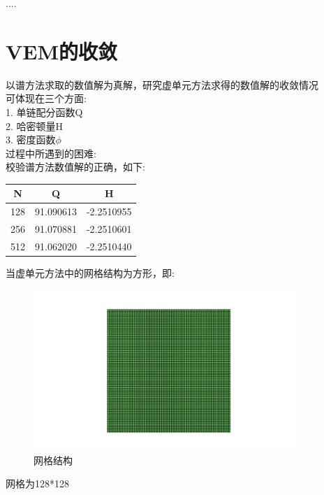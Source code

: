 \documentclass[12pt]{article}
\begin{document}
\begin{CJK}{UTF8}{gkai}
  ....\\
    \section{VEM的收敛}
    以谱方法求取的数值解为真解，研究虚单元方法求得的数值解的收敛情况\\
    
    可体现在三个方面:\\
    
    1. 单链配分函数Q\\
    
    2. 哈密顿量H\\
    
    3. 密度函数$\phi$ \\
    
    过程中所遇到的困难:\\
    
    校验谱方法数值解的正确，如下:\\
    
     \begin{table}[H]
     	\centering
     	\begin{tabular}{ccc}
     		
     		\toprule
     		N&Q & H \\
     		\midrule    
     		128&91.090613&-2.2510955\\
     		256&91.070881&-2.2510601\\
     		512&91.062020&-2.2510440\\
     		\bottomrule
     	\end{tabular}
     \end{table} 
    
     
    
    当虚单元方法中的网格结构为方形，即:\\
        \begin{figure}[H] 
        	\centering
        	\includegraphics[width=10cm]{vem.png}
        	\caption{网格结构}
        \end{figure}
        网格为128*128\\
        

\end{CJK}
\end{document}
